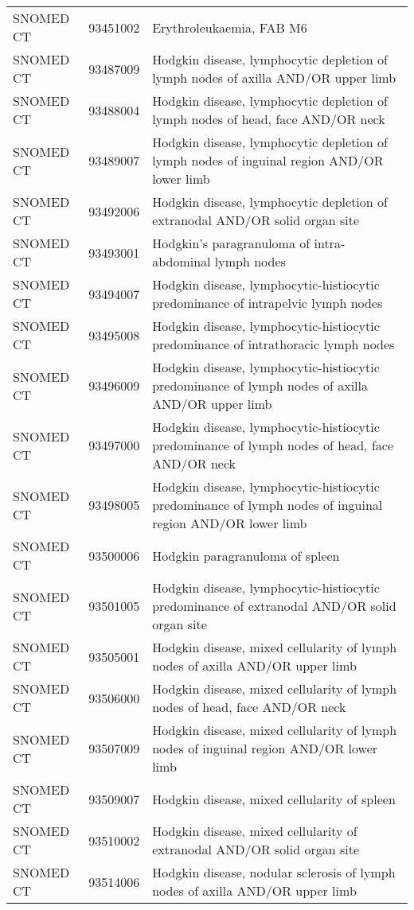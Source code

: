 \begin{table}[ht]
\begin{tabular}{lll}
  SNOMED CT & 93451002 & Erythroleukaemia, FAB M6 \\ 
  SNOMED CT & 93487009 & Hodgkin disease, lymphocytic depletion of lymph nodes of axilla AND/OR upper limb \\ 
  SNOMED CT & 93488004 & Hodgkin disease, lymphocytic depletion of lymph nodes of head, face AND/OR neck \\ 
  SNOMED CT & 93489007 & Hodgkin disease, lymphocytic depletion of lymph nodes of inguinal region AND/OR lower limb \\ 
  SNOMED CT & 93492006 & Hodgkin disease, lymphocytic depletion of extranodal AND/OR solid organ site \\ 
  SNOMED CT & 93493001 & Hodgkin's paragranuloma of intra-abdominal lymph nodes \\ 
  SNOMED CT & 93494007 & Hodgkin disease, lymphocytic-histiocytic predominance of intrapelvic lymph nodes \\ 
  SNOMED CT & 93495008 & Hodgkin disease, lymphocytic-histiocytic predominance of intrathoracic lymph nodes \\ 
  SNOMED CT & 93496009 & Hodgkin disease, lymphocytic-histiocytic predominance of lymph nodes of axilla AND/OR upper limb \\ 
  SNOMED CT & 93497000 & Hodgkin disease, lymphocytic-histiocytic predominance of lymph nodes of head, face AND/OR neck \\ 
  SNOMED CT & 93498005 & Hodgkin disease, lymphocytic-histiocytic predominance of lymph nodes of inguinal region AND/OR lower limb \\ 
  SNOMED CT & 93500006 & Hodgkin paragranuloma of spleen \\ 
  SNOMED CT & 93501005 & Hodgkin disease, lymphocytic-histiocytic predominance of extranodal AND/OR solid organ site \\ 
  SNOMED CT & 93505001 & Hodgkin disease, mixed cellularity of lymph nodes of axilla AND/OR upper limb \\ 
  SNOMED CT & 93506000 & Hodgkin disease, mixed cellularity of lymph nodes of head, face AND/OR neck \\ 
  SNOMED CT & 93507009 & Hodgkin disease, mixed cellularity of lymph nodes of inguinal region AND/OR lower limb \\ 
  SNOMED CT & 93509007 & Hodgkin disease, mixed cellularity of spleen \\ 
  SNOMED CT & 93510002 & Hodgkin disease, mixed cellularity of extranodal AND/OR solid organ site \\ 
  SNOMED CT & 93514006 & Hodgkin disease, nodular sclerosis of lymph nodes of axilla AND/OR upper limb \\ 

\end{tabular}
\end{table}
